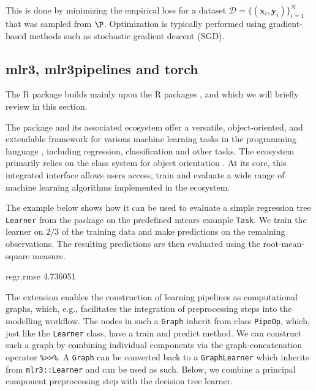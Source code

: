 \documentclass[article, nojss]{jss}
\theoremstyle{definition}
\begin{document}
This is done by minimizing the empirical loss for a dataset $\mathcal{D} = \{ (\mathbf{x}_i, \mathbf{y}_i) \}_{i=1}^N$ that was sampled from $\P$.
Optimization is typically performed using gradient-based methods such as stochastic gradient descent (SGD).

\subsection{mlr3, mlr3pipelines and torch}

The  R package builds mainly upon the R packages  \citep{ref-mlr32019},  \citep{ref-mlr3pipelines2021} and  \citep{ref-torch} which we will briefly review in this section.

The  package and its associated ecosystem offer a versatile, object-oriented, and extendable framework for various machine learning tasks in the  programming language \citep{ref-RCore2021}, including regression, classification and other tasks.
The ecosystem primarily relies on the  class system for object orientation \citep{ref-r6}.
At its core, this integrated interface allows users access, train and evaluate a wide range of machine learning algorithms implemented in the  ecosystem.

The example below shows how it can be used to evaluate a simple regression tree \texttt{Learner} from the  package \citep{ref-rpart2019} on the predefined mtcars example \texttt{Task}.
We train the learner on $2/3$ of the training data and make predictions on the remaining observations.
The resulting predictions are then evaluated using the root-mean-square measure.

\begin{CodeOutput}
regr.rmse 
 4.736051 
\end{CodeOutput}


The  extension enables the construction of learning pipelines as computational graphs, which, e.g., facilitates the integration of preprocessing steps into the modelling workflow.
The nodes in such a \texttt{Graph} inherit from class \texttt{PipeOp}, which, just like the \texttt{Learner} class, have a train and predict method.
We can construct such a graph by combining individual components via the graph-concatenation operator \texttt{\%>>\%}.
A \texttt{Graph} can be converted back to a \texttt{GraphLearner} which inherits from \texttt{mlr3::Learner} and can be used as such.
Below, we combine a principal component preprocessing step with the decision tree learner.
\end{document}
